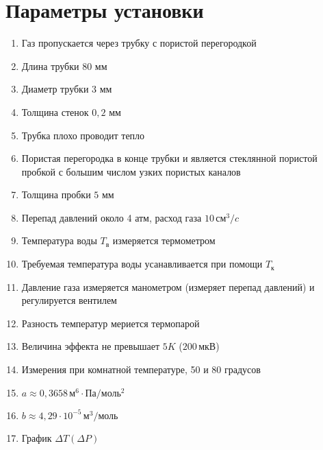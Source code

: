 \documentclass[a4paper, 12pt]{article}
\begin{document}
    \section{Параметры установки}
    \begin{enumerate}
        \item Газ пропускается через трубку с пористой перегородкой
        \item Длина трубки $80$ мм
        \item Диаметр трубки $3$ мм
        \item Толщина стенок $0{,}2$ мм
        \item Трубка плохо проводит тепло
        \item Пористая перегородка в конце трубки и является стеклянной
        пористой пробкой с большим числом узких пористых каналов
        \item Толщина пробки $5$ мм
        \item Перепад давлений около 4 атм, расход газа $10\,\text{см}^3/c$
        \item Температура воды $T_\text{в}$ измеряется термометром
        \item Требуемая температура воды усанавливается при помощи $T_\text{к}$
        \item Давление газа измеряется манометром (измеряет перепад давлений) и регулируется вентилем
        \item Разность температур мериется термопарой
        \item Величина эффекта не превышает $5 K$ ($200\,\text{мкВ}$)
        \item Измерения при комнатной температуре, 50 и 80 градусов
        \item $a\approx0{,}3658\,\text{м}^6\cdot\text{Па}/\text{моль}^2$
        \item $b\approx4{,}29\cdot 10^{-5}\,\text{м}^3/\text{моль}$
        \item График $\Delta T (\Delta P)$
    \end{enumerate}

    \newpage ~ \newpage
\end{document}
